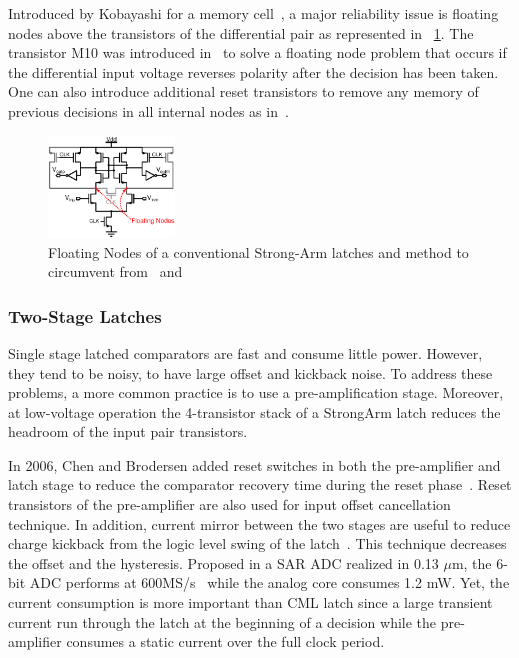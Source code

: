 Introduced by Kobayashi for a memory cell~\cite{Kobayashi1993}, a major reliability issue is floating nodes above the transistors of the differential pair as represented in \figurename~\ref{fig:sa-fn}. The transistor M10 was introduced in~\cite{Montanaro1996} to solve a floating node problem that occurs if the differential input voltage reverses polarity after the decision has been taken. One can also introduce additional reset transistors to remove any memory of previous decisions in all internal nodes as in~\cite{Verbruggen2008}.

\begin{figure}[htp]
    \centering
    \includegraphics[width=0.3\textwidth]{Chapter7/Figs/StrongArm-FloatingNodes.ps}
    \caption{Floating Nodes of a conventional Strong-Arm latches and method to circumvent from~\cite{Montanaro1996} and~\cite{Verbruggen2008}}
    \label{fig:sa-fn}
\end{figure}

\subsubsection{Two-Stage Latches}
Single stage latched comparators are fast and consume little power. However, they tend to be noisy, to have large offset and kickback noise. To address these problems, a more common practice is to use a pre-amplification stage.
Moreover, at low-voltage operation the 4-transistor stack of a StrongArm latch reduces the headroom of the input pair transistors.

In 2006, Chen and Brodersen added reset switches in both the pre-amplifier and latch stage to reduce the comparator recovery time during the reset phase~\cite{Brodersen2006}. Reset transistors of the pre-amplifier are also used for input offset cancellation technique. In addition, current mirror between the two stages are useful to reduce charge kickback from the logic level swing of the latch~\cite{Bult1997}. This technique decreases the offset and the hysteresis. Proposed in a SAR ADC realized in 0.13 \(\mu\)m, the 6-bit ADC performs at 600MS/s~\cite{Brodersen2006} while the analog core consumes 1.2 mW. Yet, the current consumption is more important than CML latch since a large transient current run through the latch at the beginning of a decision while the pre-amplifier consumes a static current over the full clock period.

